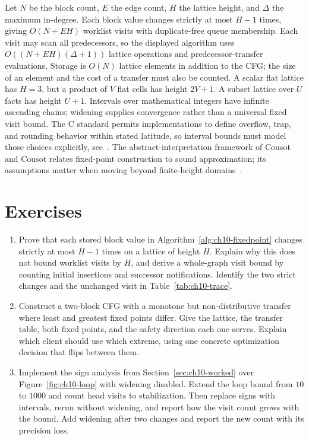 Let $N$ be the block count, $E$ the edge count, $H$ the lattice height, and $\Delta$ the maximum in-degree.
Each block value changes strictly at most $H-1$ times, giving $O(N+EH)$ worklist visits with duplicate-free queue membership.
Each visit may scan all predecessors, so the displayed algorithm uses $O((N+EH)(\Delta+1))$ lattice operations and predecessor-transfer evaluations.
Storage is $O(N)$ lattice elements in addition to the CFG; the size of an element and the cost of a transfer must also be counted.
A scalar flat lattice has $H=3$, but a product of $V$ flat cells has height $2V+1$.
A subset lattice over $U$ facts has height $U+1$.
Intervals over mathematical integers have infinite ascending chains; widening supplies convergence rather than a universal fixed visit bound.
The C standard permits implementations to define overflow, trap, and rounding behavior within stated latitude, so interval bounds must model those choices explicitly, see~\cite{wg14-2011-c11}.
The abstract-interpretation framework of Cousot and Cousot relates fixed-point construction to sound approximation; its assumptions matter when moving beyond finite-height domains~\cite{cousot-1977-abstract}.

\section{Exercises}
\label{sec:ch10-exercises}

\begin{enumerate}
\item \label{ex:ch10-height-proof} Prove that each stored block value in Algorithm~\ref{alg:ch10-fixedpoint} changes strictly at most $H-1$ times on a lattice of height $H$.
Explain why this does not bound worklist visits by $H$, and derive a whole-graph visit bound by counting initial insertions and successor notifications.
Identify the two strict changes and the unchanged visit in Table~\ref{tab:ch10-trace}.
\item \label{ex:ch10-two-extremes} Construct a two-block CFG with a monotone but non-distributive transfer where least and greatest fixed points differ.
Give the lattice, the transfer table, both fixed points, and the safety direction each one serves.
Explain which client should use which extreme, using one concrete optimization decision that flips between them.
\item \label{ex:ch10-widen-loop} Implement the sign analysis from Section~\ref{sec:ch10-worked} over Figure~\ref{fig:ch10-loop} with widening disabled.
Extend the loop bound from $10$ to $1000$ and count head visits to stabilization.
Then replace signs with intervals, rerun without widening, and report how the visit count grows with the bound.
Add widening after two changes and report the new count with its precision loss.
\end{enumerate}

